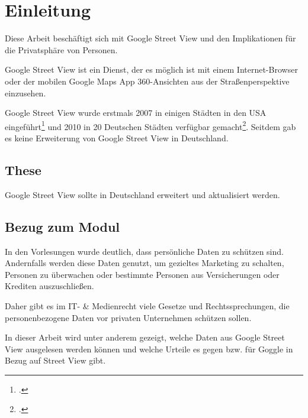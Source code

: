 \newpage

\section{Einleitung} \label{Einleitung}
Diese Arbeit beschäftigt sich mit Google Street View und den Implikationen für
die Privatsphäre von Personen.

Google Street View ist ein Dienst, der es möglich ist mit einem
Internet-Browser oder der mobilen Google Maps App 360\degree-Ansichten aus der
Straßenperspektive einzusehen.

Google Street View wurde erstmals 2007 in einigen Städten in den USA
eingeführt\footcite{website:heise:google-street-view-einfuehrung-usa} und 2010
in 20 Deutschen Städten verfügbar
gemacht\footcite{website:sueddeutsche:20-deutsche-stadte-online}. Seitdem gab es
keine Erweiterung von Google Street View in Deutschland.

\subsection{These}

Google Street View sollte in Deutschland erweitert und aktualisiert werden.

\subsection{Bezug zum Modul}

In den Vorlesungen wurde deutlich, dass persönliche Daten zu schützen sind.
Andernfalls werden diese Daten genutzt, um gezieltes Marketing zu schalten,
Personen zu überwachen oder bestimmte Personen aus Versicherungen oder Krediten
auszuschließen.

Daher gibt es im IT- \& Medienrecht viele Gesetze und Rechtssprechungen, die
personenbezogene Daten vor privaten Unternehmen schützen sollen.

In dieser Arbeit wird unter anderem gezeigt, welche Daten aus Google Street View
ausgelesen werden können und welche Urteile es gegen bzw. für Goggle in Bezug
auf Street View gibt.
